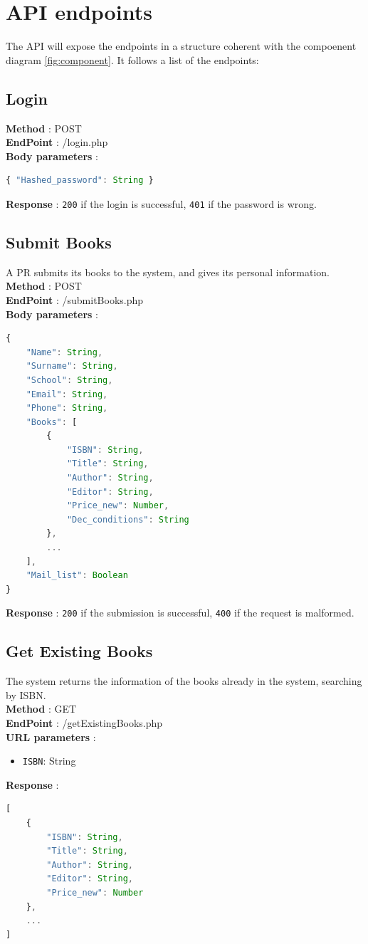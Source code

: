 \section{API endpoints}

The API will expose the endpoints in a structure coherent with the compoenent diagram \ref{fig:component}. It follows a list of the endpoints:

\subsection{Login}
\textbf{Method} : POST \\
\textbf{EndPoint} : /login.php \\
\textbf{Body parameters} :
\begin{lstlisting}[language=JavaScript, label={lst:jscode}, basicstyle=\ttfamily]
{ "Hashed_password": String }
\end{lstlisting}
\textbf{Response} : \texttt{200} if the login is successful, \texttt{401} if the password is wrong.

\subsection{Submit Books}
A PR submits its books to the system, and gives its personal information.\\
\textbf{Method} : POST \\
\textbf{EndPoint} : /submitBooks.php \\
\textbf{Body parameters} :
\begin{lstlisting}[language=JavaScript, label={lst:jscode}, basicstyle=\ttfamily]
{
    "Name": String,
    "Surname": String,
    "School": String,
    "Email": String,
    "Phone": String,
    "Books": [
        {
            "ISBN": String,
            "Title": String,
            "Author": String,
            "Editor": String,
            "Price_new": Number,
            "Dec_conditions": String
        },
        ...
    ],
    "Mail_list": Boolean
}
\end{lstlisting}
\textbf{Response} : \texttt{200} if the submission is successful, \texttt{400} if the request is malformed.

\subsection{Get Existing Books}
The system returns the information of the books already in the system, searching by ISBN.\\
\textbf{Method} : GET \\
\textbf{EndPoint} : /getExistingBooks.php \\
\textbf{URL parameters} :
\begin{itemize}
    \item \texttt{ISBN}: String
\end{itemize}
\textbf{Response} :
\begin{lstlisting}[language=JavaScript, label={lst:jscode}, basicstyle=\ttfamily]
[
    {
        "ISBN": String,
        "Title": String,
        "Author": String,
        "Editor": String,
        "Price_new": Number
    },
    ...
]
\end{lstlisting}

